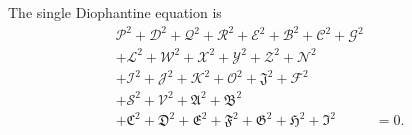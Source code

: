 The single Diophantine equation is
\[
\begin{split}
\mathcal{P}^2+\mathcal{D}^2+\mathcal{Q}^2+\mathcal{R}^2+\mathcal{E}^2+\mathcal{B}^2+\mathcal{C}^2+\mathcal{G}^2 &\\
+\mathcal{L}^2+\mathcal{W}^2+\mathcal{X}^2+\mathcal{Y}^2+\mathcal{Z}^2+\mathcal{N}^2 &\\
+\mathcal{I}^2+\mathcal{J}^2+\mathcal{K}^2+\mathcal{O}^2+\mathfrak{J}^2+\mathcal{F}^2 &\\
+\mathcal{S}^2+\mathcal{V}^2+\mathfrak{A}^2+\mathfrak{B}^2 &\\
+\mathfrak{C}^2+\mathfrak{D}^2+\mathfrak{E}^2+\mathfrak{F}^2+\mathfrak{G}^2+\mathfrak{H}^2+\mathfrak{I}^2 &= 0.
\end{split}
\]
